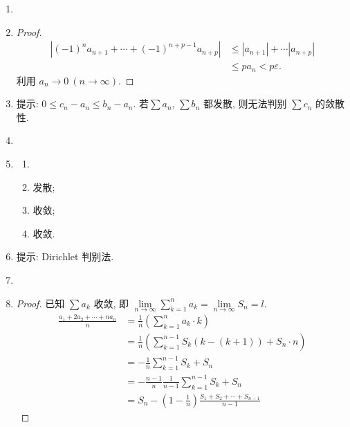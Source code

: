 \documentclass[a4paper, 11pt]{ctexart}
\begin{document}
\begin{enumerate}
    \item %
    \item %
        \begin{proof}
            \begin{align*}
                |(-1)^{n}a_{n+1} + \cdots + (-1)^{n+p-1}a_{n+p}| &\leq |a_{n+1}| + \cdots |a_{n+p}| \\
                &\leq pa_n < p\varepsilon.  
            \end{align*}
            利用 $a_n \to 0\ (n \to \infty)$.
        \end{proof}
    \item %
        提示: $0 \leq c_n - a_n \leq b_n - a_n$. 若$\sum a_n$, $\sum b_n$ 都发散, 则无法判别 $\sum c_n$ 的敛散性.
    \item %
    \item %
        \begin{multicols}{2}
            \begin{enumerate}[(1)]
                \item %
                \item %
                    发散;
                \item %
                    收敛;
                \item %
                    收敛.
            \end{enumerate}
        \end{multicols}
    \item %
        提示: Dirichlet 判别法.
    \item %
    \item %
        \begin{proof}
            已知 $\sum a_k$ 收敛, 即 $\lim\limits_{n\to\infty}\sum\limits_{k=1}^na_k = \lim\limits_{n\to\infty}S_n = l$.
            \begin{align*}
                \frac{a_1 + 2a_2 + \cdots + na_n}{n} &= \frac1n\left(\sum_{k=1}^na_k \cdot k\right) \\
                &= \frac1n\left(\sum_{k=1}^{n-1}S_k(k - (k+1)) + S_n\cdot n\right) \\
                &= -\frac1n\sum_{k=1}^{n-1}S_k + S_n \\
                &= -\frac{n-1}{n}\frac{1}{n-1}\sum_{k=1}^{n-1}S_k + S_n \\
                &= S_n - \left(1-\frac1n\right)\frac{S_{1} + S_2 + \cdots + S_{n-1}}{n-1} 
            \end{align*}

\end{proof}
\end{enumerate}
\end{document}
